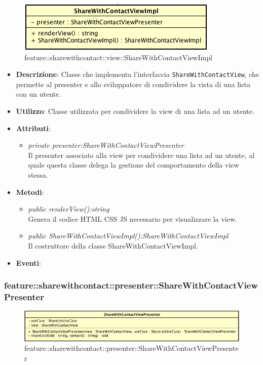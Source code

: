 \label{feature::sharewithcontact::view::ShareWithContactViewImpl}
\begin{figure}[H]
	\centering
	\includegraphics[scale=0.5]{Sezioni/SottosezioniST/img/app/ShareWithContactViewImpl.png}
	\caption{feature::sharewithcontact::view::ShareWithContactViewImpl}
\end{figure}

\begin{itemize}
\item \textbf{Descrizione}: Classe che implementa l'interfaccia \texttt{ShareWithContactView}, che permette al presenter e allo sviluppatore di condividere la vista di una lista con un utente.
\item \textbf{Utilizzo}: Classe utilizzata per condividere la view di una lista ad un utente.
\item \textbf{Attributi}: 
\begin{itemize}
\item \textit{private presenter:ShareWithContactViewPresenter}\\
	Il presenter associato alla view per condividere una lista ad un utente, al quale questa classe delega la gestione del comportamento della view stessa.
\end{itemize}
\item \textbf{Metodi}:
\begin{itemize}
\item \textit{public renderView():string}\\
	Genera il codice HTML CSS JS necessario per visualizzare la view.
\item \textit{public ShareWithContactViewImpl():ShareWithContactViewImpl}\\
	Il costruttore della classe ShareWithContactViewImpl.
\end{itemize}
\item \textbf{Eventi}:
\end{itemize}

\subsubsection{feature::sharewithcontact::presenter::ShareWithContactViewPresenter}

\label{feature::sharewithcontact::presenter::ShareWithContactViewPresenter}
\begin{figure}[H]
	\centering
	\includegraphics[scale=0.5]{Sezioni/SottosezioniST/img/app/ShareWithContactViewPresenter.png}
	\caption{feature::sharewithcontact::presenter::ShareWithContactViewPresenter}
\end{figure}

